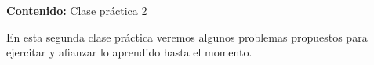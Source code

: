 {\Large
    \textbf{Contenido:} Clase práctica 2
}

En esta segunda clase práctica veremos algunos problemas propuestos para ejercitar y afianzar lo aprendido hasta el momento.
